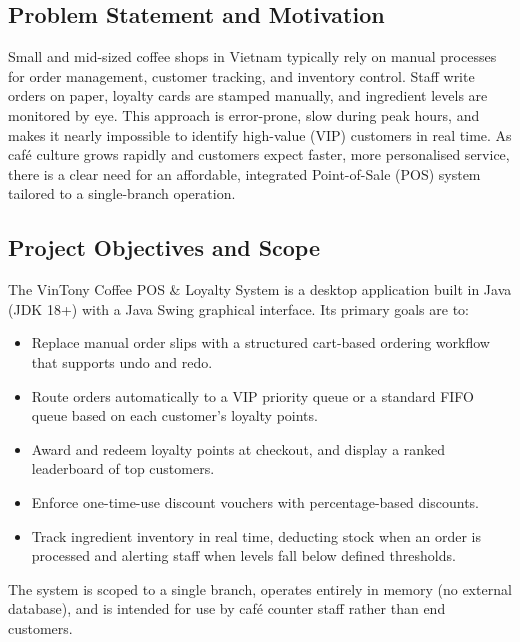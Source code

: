 \documentclass[11pt,a4paper]{article}
\begin{document}
\subsection{Problem Statement and Motivation}
Small and mid-sized coffee shops in Vietnam typically rely on manual processes for order management, customer tracking, and inventory control. Staff write orders on paper, loyalty cards are stamped manually, and ingredient levels are monitored by eye. This approach is error-prone, slow during peak hours, and makes it nearly impossible to identify high-value (VIP) customers in real time. As caf\'e culture grows rapidly and customers expect faster, more personalised service, there is a clear need for an affordable, integrated Point-of-Sale (POS) system tailored to a single-branch operation.

\subsection{Project Objectives and Scope}
The VinTony Coffee POS \& Loyalty System is a desktop application built in Java (JDK 18+) with a Java Swing graphical interface. Its primary goals are to:
\begin{itemize}[noitemsep,topsep=3pt]
    \item Replace manual order slips with a structured cart-based ordering workflow that supports undo and redo.
    \item Route orders automatically to a VIP priority queue or a standard FIFO queue based on each customer's loyalty points.
    \item Award and redeem loyalty points at checkout, and display a ranked leaderboard of top customers.
    \item Enforce one-time-use discount vouchers with percentage-based discounts.
    \item Track ingredient inventory in real time, deducting stock when an order is processed and alerting staff when levels fall below defined thresholds.
\end{itemize}
The system is scoped to a single branch, operates entirely in memory (no external database), and is intended for use by caf\'e counter staff rather than end customers.
\end{document}
